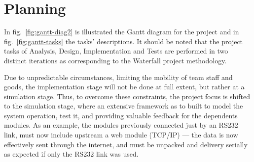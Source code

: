 \section{Planning}%
\label{sec:orga82318d}
In fig.~\ref{fig:gantt-diag2} is illustrated the Gantt diagram for the project
and in fig.~\ref{fig:gantt-tasks} the tasks' descriptions. It should be noted
that the project tasks of Analysis, Design, Implementation and Tests are
performed in two distinct iterations as corresponding to the Waterfall project
methodology.

Due to unpredictable circumstances, limiting the mobility of team
staff and goods, the implementation stage will not be done at full extent, but
rather at a simulation stage. Thus, to overcome these constraints, the project
focus is shifted to the simulation stage, where an extensive framework as to
built to model the system operation, test it, and providing valuable feedback
for the dependents modules. As an example, the modules previously connected just
by an RS232 link, must now include upstream a web module (TCP/IP) --- the data
is now effectively sent through the internet, and must be unpacked and delivery
serially as expected if only the RS232 link was used.

